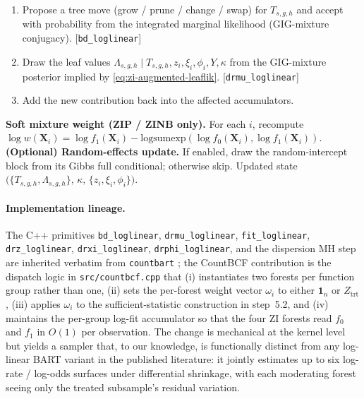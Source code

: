 \documentclass[11pt]{article}
\theoremstyle{plain}
\theoremstyle{definition}
\theoremstyle{remark}
\newcommand{\X}{\mathbf{X}}
\newcommand{\fzeroSym}{f_{0}}
\newcommand{\foneSym}{f_{1}}
\newcommand{\zilat}{z_{i}}
\newcommand{\xilat}{\xi_{i}}
\newcommand{\philat}{\phi_{i}}
\newcommand{\omegai}{\omega_{i}}
\newcommand{\logsumexp}{\mathrm{logsumexp}}
\newcommand{\softw}{w}
\begin{document}
\begin{algorithm}[t]
\begin{algorithmic}[1]
\begin{enumerate}[label*=5.\arabic*, leftmargin=*, topsep=2pt, itemsep=2pt]
            \item Propose a tree move (grow / prune / change / swap)
                  for $T_{s, g, h}$ and accept with probability from
                  the integrated marginal likelihood (GIG-mixture
                  conjugacy). [\texttt{bd\_loglinear}]
            \item Draw the leaf values
                  $\Lambda_{s, g, h} \mid T_{s, g, h}, \zilat, \xilat,
                  \philat, Y, \kappa$ from the GIG-mixture posterior
                  implied by \eqref{eq:zi-augmented-leaflik}.
                  [\texttt{drmu\_loglinear}]
            \item Add the new contribution back into the affected
                  accumulators.
         \end{enumerate}
  \Statex
  \State \textbf{Soft mixture weight (ZIP / ZINB only).}
         For each $i$, recompute
         $\log \softw(\X_i) = \log\foneSym(\X_i) -
         \logsumexp(\log\fzeroSym(\X_i), \log\foneSym(\X_i))$.
  \Statex
  \State \textbf{(Optional) Random-effects update.} If enabled, draw
         the random-intercept block from its Gibbs full conditional;
         otherwise skip.
  \Statex
  \State \Return Updated state
         $\bigl(\{T_{s,g,h}, \Lambda_{s,g,h}\},\, \kappa,\,
                \{\zilat, \xilat, \philat\}\bigr)$.
\end{algorithmic}
\end{algorithm}

\paragraph{Implementation lineage.}
The C++ primitives \texttt{bd\_loglinear}, \texttt{drmu\_loglinear},
\texttt{fit\_loglinear}, \texttt{drz\_loglinear},
\texttt{drxi\_loglinear}, \texttt{drphi\_loglinear}, and the
dispersion MH step are inherited verbatim from \texttt{countbart}
\citep{wikle2023causal}; the CountBCF contribution is the dispatch
logic in \texttt{src/countbcf.cpp} that (i) instantiates two forests
per function group rather than one, (ii) sets the per-forest weight
vector $\omegai$ to either $\mathbf{1}_n$ or $Z_{\mathrm{trt}}$, (iii)
applies $\omegai$ to the sufficient-statistic construction in
step~5.2, and (iv) maintains the per-group log-fit accumulator so
that the four ZI forests read $\fzeroSym$ and $\foneSym$ in $O(1)$
per observation. The change is mechanical at the kernel level but
yields a sampler that, to our knowledge, is functionally distinct
from any log-linear BART variant in the published literature: it
jointly estimates up to six log-rate / log-odds surfaces under
differential shrinkage, with each moderating forest seeing only the
treated subsample's residual variation.
\end{document}
